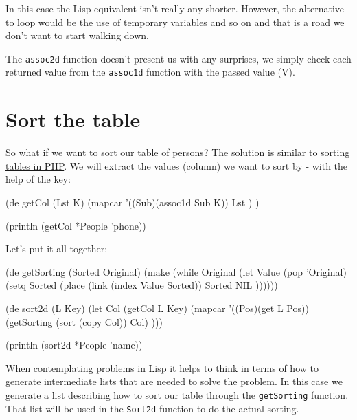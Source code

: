 
In this case the Lisp equivalent isn't really any shorter. However, the
alternative to loop would be the use of temporary variables and so on
and that is a road we don't want to start walking down.

The \texttt{assoc2d} function doesn't present us with any surprises, we simply
check each returned value from the \texttt{assoc1d} function with the passed
value (V).


\section{Sort the table}
\label{sec:work-with-tables-sort-the-table}

So what if we want to sort our table of persons? The solution is similar
to sorting
\href{http://www.prodevtips.com/2008/01/06/sorting-2d-arrays-in-php-anectodes-and-reflections/}{tables in PHP}. We will extract the values (column) we want to sort by - with
the help of the key:

\begin{wideverbatim}
(de getCol (Lst K)
    (mapcar '((Sub)(assoc1d Sub K)) Lst ) )
    
(println (getCol *People 'phone))
\end{wideverbatim}

Let's put it all together:


\begin{wideverbatim}
(de getSorting (Sorted Original)
    (make
     (while Original
            (let Value (pop 'Original)
              (setq Sorted 
                    (place 
                     (link (index Value Sorted)) Sorted NIL ))))))

(de sort2d (L Key)  
     (let Col (getCol L Key)
       (mapcar '((Pos)(get L Pos)) (getSorting (sort (copy Col)) Col) )))

(println (sort2d *People 'name))
\end{wideverbatim}

When contemplating problems in Lisp it helps to think in terms of how
to generate intermediate lists that are needed to solve the problem.
In this case we generate a list describing how to sort our table
through the \texttt{getSorting} function. That list will be used in
the \texttt{Sort2d} function to do the actual sorting.

